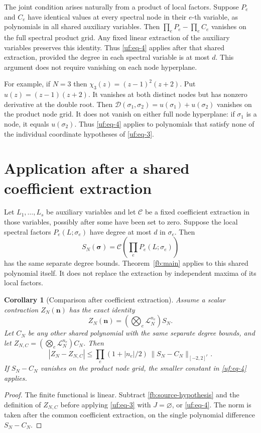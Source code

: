 \documentclass[11pt]{article}
\numberwithin{equation}{section}
\newtheorem{corollary}[theorem]{Corollary}
\theoremstyle{definition}\newtheorem{definition}[theorem]{Definition}
\theoremstyle{remark}\newtheorem{remark}[theorem]{Remark}
\begin{document}
The joint condition arises naturally from a product of local factors.
Suppose $P_e$ and $C_e$ have identical values at every spectral node
in their $e$-th variable, as polynomials in all shared auxiliary variables.
Then $\prod_eP_e-\prod_eC_e$ vanishes on the full spectral product grid.
Any fixed linear extraction of the auxiliary variables preserves this
identity. Thus \eqref{uf:eq-4} applies after that shared extraction,
provided the degree in each spectral variable is at most $d$.
This argument does not require vanishing on each node hyperplane.

For example, if $N=3$ then $\chi_3(z)=(z-1)^2(z+2)$.
Put $u(z)=(z-1)(z+2)$. It vanishes at both distinct nodes but has
nonzero derivative at the double root. Then
$\mathcal D(\sigma_1,\sigma_2)=u(\sigma_1)+u(\sigma_2)$ vanishes
on the product node grid. It does not vanish on either full node
hyperplane: if $\sigma_1$ is a node, it equals $u(\sigma_2)$.
Thus \eqref{uf:eq-4} applies to polynomials that satisfy none of
the individual coordinate hypotheses of \eqref{uf:eq-3}.




\section{Application after a shared coefficient extraction}
\label{fb:application}

Let $L_1,\ldots,L_s$ be auxiliary variables and let
$\mathcal C$ be a fixed coefficient extraction in those variables,
possibly after some have been set to zero. Suppose the local spectral
factors $P_e(L;\sigma_e)$ have degree at most $d$ in $\sigma_e$.
Then
\[
 S_N(\boldsymbol\sigma)=\mathcal C\!\left(\prod_eP_e(L;\sigma_e)\right)
\]
has the same separate degree bounds. Theorem~\ref{fb:main} applies to
this shared polynomial itself. It does not replace the extraction by
independent maxima of its local factors.

\begin{corollary}[Comparison after coefficient extraction]\label{fb:source-application}
Assume a scalar contraction $Z_N(\boldsymbol n)$ has the exact identity
\begin{equation}\label{fb:source-hypothesis}
 Z_N(\boldsymbol n)
  =\left(\bigotimes_e\mathcal L_N^{n_e}\right)S_N.
\end{equation}
Let $C_N$ be any other shared polynomial with the same separate degree
bounds, and let $Z_{N,C}=(\bigotimes_e\mathcal L_N^{n_e})C_N$. Then
\[
 |Z_N-Z_{N,C}|\le
       \prod_e(1+|n_e|/2)\,\|S_N-C_N\|_{[-2,2]^r}.
\]
If $S_N-C_N$ vanishes on the product node grid, the smaller constant
in \eqref{uf:eq-4} applies.
\end{corollary}
\begin{proof}
The finite functional is linear. Subtract \eqref{fb:source-hypothesis}
and the definition of $Z_{N,C}$ before applying \eqref{uf:eq-3} with
$J=\varnothing$, or \eqref{uf:eq-4}. The norm is taken after the
common coefficient extraction, on the single polynomial difference
$S_N-C_N$.
\end{proof}
\end{document}
